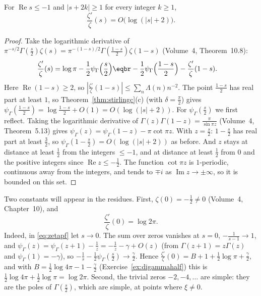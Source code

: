 \begin{lemma}\label{lem:leftzeta}
For $\operatorname{Re}s\le-1$ and $|s+2k|\ge1$ for every integer $k\ge1$,
\[
\frac{\zeta'}\zeta(s)=O\bigl(\log(|s|+2)\bigr).
\]
\end{lemma}
\begin{proof}
Take the logarithmic derivative of $\pi^{-s/2}\Gamma(\frac s2)\zeta(s)=\pi^{-(1-s)/2}\Gamma(\frac{1-s}2)\zeta(1-s)$ (Volume~4, Theorem~10.8):
\[
\begin{aligned}\frac{\zeta'}\zeta(s)&=\log\pi-\frac12\psi_\Gamma\Bigl(\frac s2\Bigr)\eqbr-\frac12\psi_\Gamma\Bigl(\frac{1-s}2\Bigr)-\frac{\zeta'}\zeta(1-s).\end{aligned}
\]
Here $\operatorname{Re}(1-s)\ge2$, so $|\frac{\zeta'}\zeta(1-s)|\le\sum_n\Lambda(n)n^{-2}$. The point $\frac{1-s}2$ has real part at least $1$, so Theorem~\ref{thm:stirlingc}(c) (with $\delta=\frac\pi2$) gives
$\psi_\Gamma(\frac{1-s}2)=\log\frac{1-s}2+O(1)=O(\log(|s|+2))$. For $\psi_\Gamma(\frac s2)$ we first reflect. Taking the logarithmic derivative of $\Gamma(z)\Gamma(1-z)=\frac\pi{\sin\pi z}$
(Volume~4, Theorem~5.13) gives $\psi_\Gamma(z)=\psi_\Gamma(1-z)-\pi\cot\pi z$. With $z=\frac s2$: $1-\frac s2$ has real part at least $\frac32$, so $\psi_\Gamma(1-\frac s2)=O(\log(|s|+2))$ as before. And $z$
stays at distance at least $\frac12$ from the integers $\le-1$, and at distance at least $\frac12$ from $0$ and the positive integers since $\operatorname{Re}z\le-\frac12$. The function $\cot\pi z$ is $1$-periodic,
continuous away from the integers, and tends to $\mp i$ as $\operatorname{Im}z\to\pm\infty$, so it is bounded on this set.
\end{proof}

Two constants will appear in the residues. First, $\zeta(0)=-\frac12\ne0$ (Volume~4, Chapter~10), and
\begin{equation}\label{eq:zetaprime0}
\frac{\zeta'}\zeta(0)=\log2\pi.
\end{equation}
Indeed, in \eqref{eq:zetapf} let $s\to0$. The sum over zeros vanishes at $s=0$, $-\frac1{s-1}\to1$, and $\psi_\Gamma(z)=\psi_\Gamma(z+1)-\frac1z=-\frac1z-\gamma+O(z)$ (from $\Gamma(z+1)=z\Gamma(z)$ and
$\psi_\Gamma(1)=-\gamma$), so $-\frac1s-\frac12\psi_\Gamma(\frac s2)\to\frac\gamma2$. Hence $\frac{\zeta'}\zeta(0)=B+1+\frac12\log\pi+\frac\gamma2$, and with $B=\frac12\log4\pi-1-\frac\gamma2$
(Exercise~\ref{ex:digammahalf}) this is $\frac12\log4\pi+\frac12\log\pi=\log2\pi$. Second, the trivial zeros $-2,-4,\dots$ are simple: they are the poles of $\Gamma(\frac s2)$, which are simple, at points
where $\xi\ne0$.

